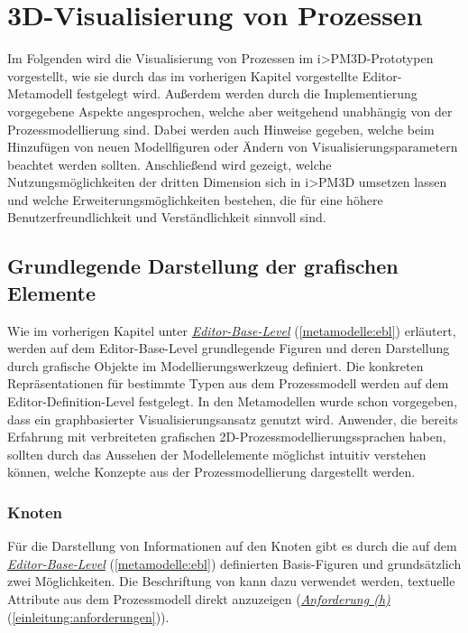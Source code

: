 \documentclass[a4paper,10pt]{sphinxmanual}
\begin{document}
\chapter{3D-Visualisierung von Prozessen}
\label{visualisierung::doc}\label{visualisierung:visualisierung}\label{visualisierung:d-visualisierung-von-prozessen}
Im Folgenden wird die Visualisierung von Prozessen im i\textgreater{}PM3D-Prototypen vorgestellt, wie sie durch das im vorherigen Kapitel vorgestellte Editor-Metamodell festgelegt wird.
Außerdem werden durch die Implementierung vorgegebene Aspekte angesprochen, welche aber weitgehend unabhängig von der Prozessmodellierung sind.
Dabei werden auch Hinweise gegeben, welche beim Hinzufügen von neuen Modellfiguren oder Ändern von Visualisierungsparametern beachtet werden sollten.
Anschließend wird gezeigt, welche Nutzungsmöglichkeiten der dritten Dimension sich in i\textgreater{}PM3D umsetzen lassen und welche Erweiterungsmöglichkeiten bestehen, die für eine höhere Benutzerfreundlichkeit und Verständlichkeit sinnvoll sind.


\section{Grundlegende Darstellung der grafischen Elemente}
\label{visualisierung:grundlegende-darstellung-der-grafischen-elemente}
Wie im vorherigen Kapitel unter {\hyperref[metamodelle:ebl]{\emph{Editor-Base-Level}}} (\autoref*{metamodelle:ebl}) erläutert, werden auf dem Editor-Base-Level grundlegende Figuren und deren Darstellung durch grafische Objekte im Modellierungswerkzeug definiert.
Die konkreten Repräsentationen für bestimmte Typen aus dem Prozessmodell werden auf dem Editor-Definition-Level festgelegt.
In den Metamodellen wurde schon vorgegeben, dass ein graphbasierter Visualisierungsansatz genutzt wird.
Anwender, die bereits Erfahrung mit verbreiteten grafischen 2D-Prozessmodellierungssprachen haben, sollten durch das Aussehen der Modellelemente möglichst intuitiv verstehen können, welche Konzepte aus der Prozessmodellierung dargestellt werden.


\subsection{Knoten}
\label{visualisierung:knoten}
Für die Darstellung von Informationen auf den Knoten gibt es durch die auf dem {\hyperref[metamodelle:ebl]{\emph{Editor-Base-Level}}} (\autoref*{metamodelle:ebl}) definierten Basis-Figuren  und  grundsätzlich zwei Möglichkeiten.
Die Beschriftung von  kann dazu verwendet werden, textuelle Attribute aus dem Prozessmodell direkt anzuzeigen ({\hyperref[einleitung:anforderungen]{\emph{Anforderung (h)}}} (\autoref*{einleitung:anforderungen})).
\end{document}
